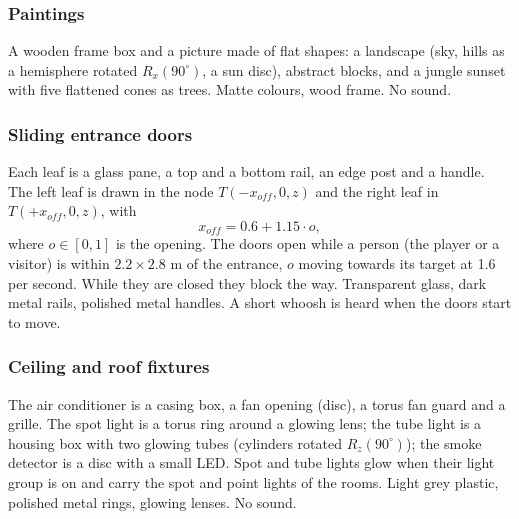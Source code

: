 \subsubsection{Paintings}
 A wooden frame box and a picture made of flat shapes: a landscape (sky, hills as a
hemisphere rotated $R_x(90^\circ)$, a sun disc), abstract blocks, and a jungle sunset with five flattened cones
as trees.
 Matte colours, wood frame. No sound.

\subsubsection{Sliding entrance doors}

 Each leaf is a glass pane, a top and a bottom rail, an edge post and a handle. The left
leaf is drawn in the node $T(-x_{off},0,z)$ and the right leaf in $T(+x_{off},0,z)$, with
\[
x_{off} = 0.6 + 1.15\cdot o,
\]
where $o\in[0,1]$ is the opening.
 The doors open while a person (the player or a visitor) is within $2.2\times2.8$ m of the
entrance, $o$ moving towards its target at 1.6 per second. While they are closed they block the way.
 Transparent glass, dark metal rails, polished metal handles. A short
whoosh is heard when the doors start to move.

\subsubsection{Ceiling and roof fixtures}
 The air conditioner is a casing box, a fan opening (disc), a torus fan guard and a
grille. The spot light is a torus ring around a glowing lens; the tube light is a housing box with two glowing
tubes (cylinders rotated $R_z(90^\circ)$); the smoke detector is a disc with a small LED.
 Spot and tube lights glow when their light group is on and carry the spot and point lights
of the rooms.
 Light grey plastic, polished metal rings, glowing lenses. No sound.

